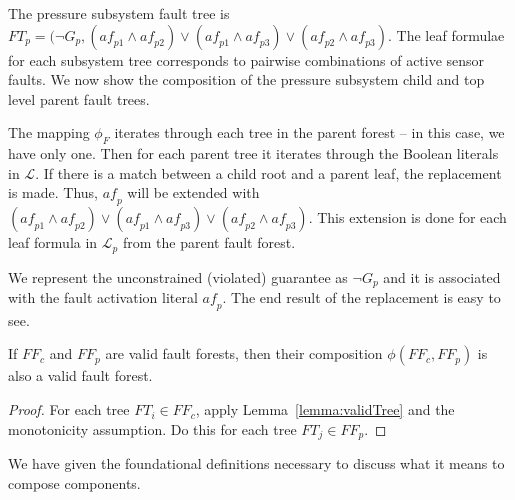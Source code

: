 The pressure subsystem fault tree is $\mathit{FT}_{p} = (\neg G_p, (\mathit{af}_{p1} \land \mathit{af}_{p2}) \lor (\mathit{af}_{p1} \land \mathit{af}_{p3}) \lor (\mathit{af}_{p2} \land \mathit{af}_{p3}) $. The leaf formulae for each subsystem tree corresponds to pairwise combinations of active sensor faults. We now show the composition of the pressure subsystem child and top level parent fault trees. 

The mapping $\phi_F$ iterates through each tree in the parent forest -- in this case, we have only one. Then for each parent tree it iterates through the Boolean literals in $\mathcal{L}$. If there is a match between a child root and a parent leaf, the replacement is made.
Thus, $\mathit{af}_p$ will be extended with $(\mathit{af}_{p1} \land \mathit{af}_{p2}) \lor (\mathit{af}_{p1} \land \mathit{af}_{p3}) \lor (\mathit{af}_{p2} \land \mathit{af}_{p3})$. This extension is done for each leaf formula in $\mathcal{L}_p$ from the parent fault forest. 

We represent the unconstrained (violated) guarantee as $\neg G_p$ and it is associated with the fault activation literal $\mathit{af}_p$. The end result of the replacement is easy to see.

\begin{lemma} If $\mathit{FF}_c$ and $\mathit{FF}_p$ are valid fault forests, then their composition $\phi(\mathit{FF}_c, \mathit{FF}_p)$ is also a valid fault forest. 
\begin{proof}

For each tree $\mathit{FT}_i \in \mathit{FF}_c$, apply Lemma~\ref{lemma:validTree} and the monotonicity assumption. Do this for each tree $\mathit{FT}_j \in \mathit{FF}_p$.
\end{proof}
\label{lemma:validForest}
\end{lemma}











We have given the foundational definitions necessary to discuss what it means to compose components. 

